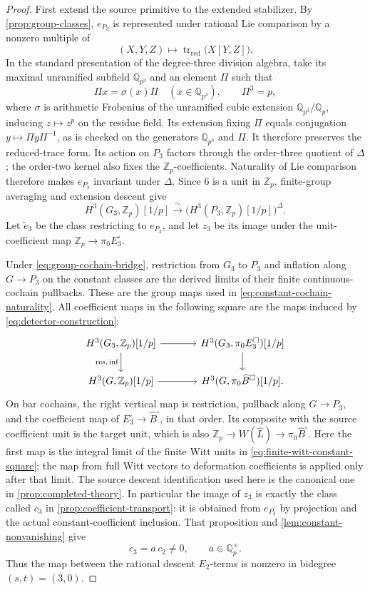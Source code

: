 \documentclass[11pt]{article}
\numberwithin{equation}{section}
\theoremstyle{definition}
\theoremstyle{remark}
\begin{document}
\begin{proof}
First extend the source primitive to the extended stabilizer.
By \cref{prop:group-classes}, $e_{P_3}$ is represented under rational
Lie comparison by a nonzero multiple of
\[
 (X,Y,Z)\longmapsto\operatorname{tr}_{\mathrm{red}}\bigl(X[Y,Z]\bigr).
\]
In the standard presentation of the degree-three division algebra,
take its maximal unramified subfield $\mathbb Q_{p^3}$ and an element $\Pi$
such that
\[
 \Pi x=\sigma(x)\Pi\quad(x\in\mathbb Q_{p^3}),\qquad \Pi^3=p,
\]
where $\sigma$ is arithmetic Frobenius of the unramified cubic
extension $\mathbb Q_{p^3}/\mathbb Q_p$, inducing $z\mapsto z^p$ on the residue
field. Its extension fixing $\Pi$ equals conjugation
$y\mapsto\Pi y\Pi^{-1}$, as is checked on the generators
$\mathbb Q_{p^3}$ and $\Pi$. It therefore preserves the reduced-trace form.
Its action on $P_3$ factors through the order-three quotient of
$\Delta$; the order-two kernel also fixes the $\mathbb Z_p$-coefficients.
Naturality of Lie comparison therefore makes $e_{P_3}$ invariant under
$\Delta$.  Since $6$ is a unit in $\mathbb Z_p$, finite-group averaging and
extension descent give
\[
 H^3(G_3,\mathbb Z_p)[1/p]
    \xrightarrow{\ \sim\ }
       \bigl(H^3(P_3,\mathbb Z_p)[1/p]\bigr)^\Delta.
\]
Let $\widetilde e_3$ be the class restricting to $e_{P_3}$, and let
$z_3$ be its image under the unit-coefficient map
$\mathbb Z_p\to\pi_0E_3^{\square}$.

Under \eqref{eq:group-cochain-bridge}, restriction from $G_3$ to $P_3$
and inflation along $G\to P_3$ on the constant classes are the
derived limits of their finite continuous-cochain pullbacks.  These
are the group maps used in \eqref{eq:constant-cochain-naturality}.
All coefficient maps in the following square are the maps induced by
\eqref{eq:detector-construction}:
\[
\begin{tikzcd}[column sep=large]
 H^3(G_3,\mathbb Z_p)[1/p]
   \arrow[r] \arrow[d,"{\mathrm{res},\,\mathrm{inf}}"']
 & H^3(G_3,\pi_0E_3^{\square})[1/p]\arrow[d]\\
 H^3(G,\mathbb Z_p)[1/p]\arrow[r]
 & H^3(G,\pi_0\widehat B^{\square})[1/p].
\end{tikzcd}
\]
On bar cochains, the right vertical map is restriction, pullback along
$G\to P_3$, and the coefficient map of
$E_3^{\square}\to\widehat B^{\square}$, in that order.
Its composite with the source coefficient unit is the target unit,
which is also $\mathbb Z_p\to W(\widehat L)\to\pi_0\widehat B^{\square}$.
Here the first map is the integral limit of the finite Witt units in
\eqref{eq:finite-witt-constant-square}; the map from full Witt vectors
to deformation coefficients is applied only after that limit.
The source descent identification used here is the canonical one in
\cref{prop:completed-theory}.
In particular the image of $z_3$ is exactly the class called $c_3$ in
\cref{prop:coefficient-transport}: it is obtained from $e_{P_3}$ by
projection and the actual constant-coefficient inclusion.  That
proposition and \cref{lem:constant-nonvanishing} give
\[
 c_3=a\,c_2\ne0,\qquad a\in\mathbb Q_p^{\times}.
\]
Thus the map between the rational descent $E_2$-terms is nonzero in
bidegree $(s,t)=(3,0)$.


\end{proof}
\end{document}
